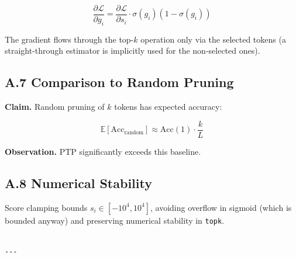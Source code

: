 \[
\frac{\partial \mathcal{L}}{\partial g_i} = \frac{\partial \mathcal{L}}{\partial s_i} \cdot \sigma(g_i)(1 - \sigma(g_i))
\tag{A.4}
\]

The gradient flows through the top-$k$ operation only via the selected 
tokens (a straight-through estimator is implicitly used for the 
non-selected ones).

\subsection{A.7 Comparison to Random Pruning}

\textbf{Claim.} Random pruning of $k$ tokens has expected accuracy:

\[
\mathbb{E}[\text{Acc}_\text{random}] \approx \text{Acc}(1) \cdot \frac{k}{L}
\tag{A.5}
\]

\textbf{Observation.} PTP significantly exceeds this baseline.

\subsection{A.8 Numerical Stability}

Score clamping bounds $s_i \in [-10^4, 10^4]$, avoiding overflow in 
sigmoid (which is bounded anyway) and preserving numerical stability 
in \texttt{topk}.
\begin{lstlisting}

---
\end{lstlisting}
